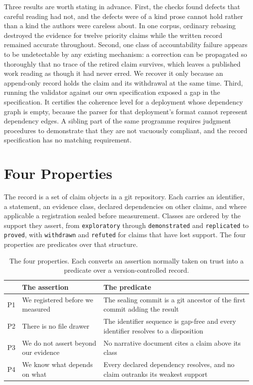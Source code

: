 \documentclass[journal]{IEEEtran}
\begin{document}
Three results are worth stating in advance. First, the checks found defects that
careful reading had not, and the defects were of a kind prose cannot hold rather
than a kind the authors were careless about. In one corpus, ordinary rebasing
destroyed the evidence for twelve priority claims while the written record
remained accurate throughout. Second, one class of accountability failure appears
to be undetectable by any existing mechanism: a correction can be propagated so
thoroughly that no trace of the retired claim survives, which leaves a published
work reading as though it had never erred. We recover it only because an
append-only record holds the claim and its withdrawal at the same time. Third,
running the validator against our own specification exposed a gap in the
specification. It certifies the coherence level for a deployment whose dependency
graph is empty, because the parser for that deployment's format cannot represent
dependency edges. A sibling part of the same programme requires judgment
procedures to demonstrate that they are not vacuously compliant, and the record
specification has no matching requirement.

\section{Four Properties}
\label{sec:properties}

The record is a set of claim objects in a git repository. Each carries an
identifier, a statement, an evidence class, declared dependencies on other
claims, and where applicable a registration sealed before measurement. Classes
are ordered by the support they assert, from \texttt{exploratory} through
\texttt{demonstrated} and \texttt{replicated} to \texttt{proved}, with
\texttt{withdrawn} and \texttt{refuted} for claims that have lost support. The
four properties are predicates over that structure.

\begin{table}[!t]
\caption{The four properties. Each converts an assertion normally taken on trust
into a predicate over a version-controlled record.}
\label{tab:props}
\centering
\footnotesize
\begin{tabular}{@{}p{}p{}p{}@{}}
\toprule
& \textbf{The assertion} & \textbf{The predicate} \\
\midrule
P1 & We registered before we measured & The sealing commit is a git ancestor of the first commit adding the result \\
P2 & There is no file drawer & The identifier sequence is gap-free and every identifier resolves to a disposition \\
P3 & We do not assert beyond our evidence & No narrative document cites a claim above its class \\
P4 & We know what depends on what & Every declared dependency resolves, and no claim outranks its weakest support \\
\bottomrule
\end{tabular}
\end{table}
\end{document}
